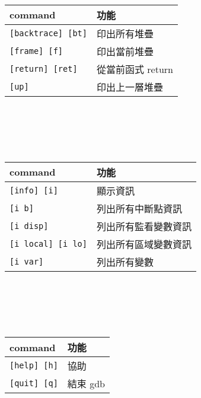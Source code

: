 \begin{center}
     \\
    \begin{tabular}{|p{2.28cm}|p{2.68cm}|}
        \hline
        command                         & 功能 \\
        \hline
        \verb|[backtrace] [bt]|         & 印出所有堆疊 \\
        \verb|[frame] [f]|              & 印出當前堆疊 \\
        \verb|[return] [ret]|           & 從當前函式 return \\
        \verb|[up]|                     & 印出上一層堆疊 \\
        \hline
    \end{tabular} \\
    \hspace{\fill} \\
    \hspace{\fill} \\

     \\
    \begin{tabular}{|p{2.28cm}|p{2.68cm}|}
        \hline
        command                         & 功能 \\
        \hline
        \verb|[info] [i]|               & 顯示資訊 \\
        \verb|[i b]|                    & 列出所有中斷點資訊 \\
        \verb|[i disp]|                 & 列出所有監看變數資訊 \\
        \verb|[i local] [i lo]|         & 列出所有區域變數資訊 \\
        \verb|[i var]|                  & 列出所有變數 \\
        \hline
    \end{tabular} \\
    \hspace{\fill} \\
    \hspace{\fill} \\

     \\
    \begin{tabular}{|p{2.28cm}|p{2.68cm}|}
        \hline
        command                         & 功能 \\
        \hline
        \verb|[help] [h]|               & 協助 \\
        \verb|[quit] [q]|               & 結束 gdb \\
        \hline
    \end{tabular}
\end{center}